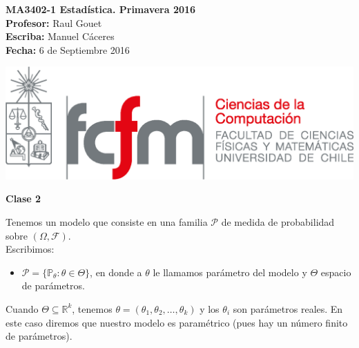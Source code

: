 \documentclass[10pt]{article}
\theoremstyle{plain}
\theoremstyle{definition}
\newcommand{\catnum}{2} %
\newcommand{\fecha}{6 de Septiembre 2016 }
\begin{document}
\vspace*{-1.2 cm}
\begin{minipage}{0.6\textwidth}
\begin{flushleft}
\hspace*{-0.5cm}\textbf{MA3402-1 Estadística. Primavera 2016}\\
\hspace*{-0.5cm}\textbf{Profesor:} Raul Gouet\\
\hspace*{-0.5cm}\textbf{Escriba:} Manuel Cáceres\\
\hspace*{-0.5cm}\textbf{Fecha:} \fecha
\end{flushleft}
\end{minipage}
\begin{minipage}{0.36\textwidth}
\begin{flushright}
\includegraphics[scale=0.3]{imagenes/fcfm_dcc}
\end{flushright}
\end{minipage}
\bigskip

\begin{center}
\LARGE\textbf{Clase \catnum}
\end{center}

Tenemos un modelo que consiste en una familia $\mathcal{P}$ de medida de probabilidad sobre $(\Omega, \mathcal{F})$.\\

Escribimos:
\begin{itemize}
\item $\mathcal{P}=\{\mathbb{P}_{\theta}\colon \theta \in \Theta \}$, en donde a $\theta$ le llamamos parámetro del modelo y $\Theta$ espacio de parámetros.
\end{itemize}
Cuando $\Theta \subseteq \mathbb{R}^k$, tenemos $\theta = (\theta_{1}, \theta_{2}, \ldots, \theta_{k})$ y los $\theta_{i}$ son parámetros reales. En este caso diremos que nuestro modelo es paramétrico (pues hay un número finito de parámetros).\\
\end{document}
